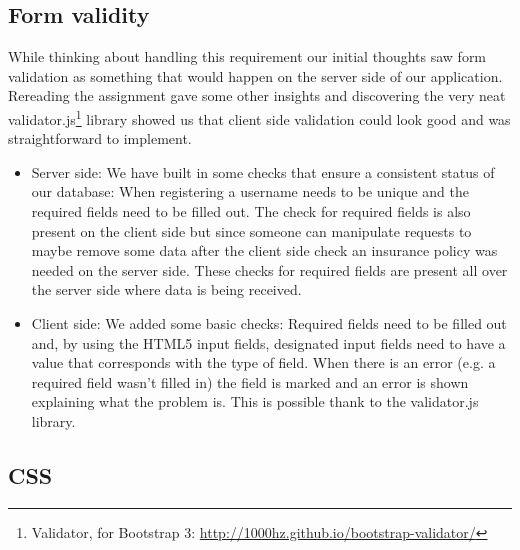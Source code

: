 \documentclass{article}
\begin{document}
\subsection{Form validity}
While thinking about handling this requirement our initial thoughts saw form validation as something that would happen on the server side of our application. Rereading the assignment gave some other insights and discovering the very neat validator.js\footnote{Validator, for Bootstrap 3: \url{http://1000hz.github.io/bootstrap-validator/} } library showed us that client side validation could look good and was straightforward to implement.
\begin{itemize}
	\item Server side: We have built in some checks that ensure a consistent status of our database: When registering a username needs to be unique and the required fields need to be filled out. The check for required fields is also present on the client side but since someone can manipulate requests to maybe remove some data after the client side check an insurance policy was needed on the server side. These checks for required fields are present all over the server side where data is being received.
	\item Client side: We added some basic checks: Required fields need to be filled out and, by using the HTML5 input fields, designated input fields need to have a value that corresponds with the type of field. When there is an error (e.g. a required field wasn't filled in) the field is marked and an error is shown explaining what the problem is. This is possible thank to the validator.js library.
\end{itemize}

\subsection{CSS}
\end{document}
